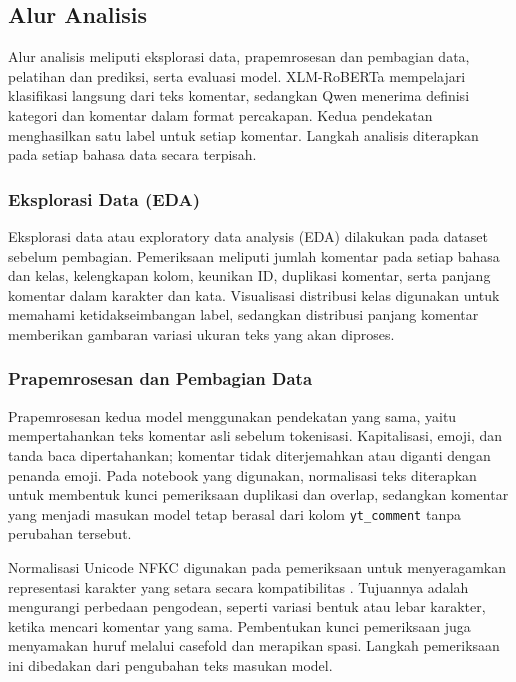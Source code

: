 \documentclass[11pt]{article}
\begin{document}
\subsection{Alur Analisis}
Alur analisis meliputi eksplorasi data, prapemrosesan dan pembagian data, pelatihan dan prediksi, serta evaluasi model. XLM-RoBERTa mempelajari klasifikasi langsung dari teks komentar, sedangkan Qwen menerima definisi kategori dan komentar dalam format percakapan. Kedua pendekatan menghasilkan satu label untuk setiap komentar. Langkah analisis diterapkan pada setiap bahasa data secara terpisah.

\subsubsection{Eksplorasi Data (EDA)}
Eksplorasi data atau exploratory data analysis (EDA) dilakukan pada dataset sebelum pembagian. Pemeriksaan meliputi jumlah komentar pada setiap bahasa dan kelas, kelengkapan kolom, keunikan ID, duplikasi komentar, serta panjang komentar dalam karakter dan kata. Visualisasi distribusi kelas digunakan untuk memahami ketidakseimbangan label, sedangkan distribusi panjang komentar memberikan gambaran variasi ukuran teks yang akan diproses.

\subsubsection{Prapemrosesan dan Pembagian Data}
Prapemrosesan kedua model menggunakan pendekatan yang sama, yaitu mempertahankan teks komentar asli sebelum tokenisasi. Kapitalisasi, emoji, dan tanda baca dipertahankan; komentar tidak diterjemahkan atau diganti dengan penanda emoji. Pada notebook yang digunakan, normalisasi teks diterapkan untuk membentuk kunci pemeriksaan duplikasi dan overlap, sedangkan komentar yang menjadi masukan model tetap berasal dari kolom \texttt{yt\_comment} tanpa perubahan tersebut.

Normalisasi Unicode NFKC digunakan pada pemeriksaan untuk menyeragamkan representasi karakter yang setara secara kompatibilitas \citep{unicode-consortium-2026-normalization}. Tujuannya adalah mengurangi perbedaan pengodean, seperti variasi bentuk atau lebar karakter, ketika mencari komentar yang sama. Pembentukan kunci pemeriksaan juga menyamakan huruf melalui casefold dan merapikan spasi. Langkah pemeriksaan ini dibedakan dari pengubahan teks masukan model.
\end{document}
